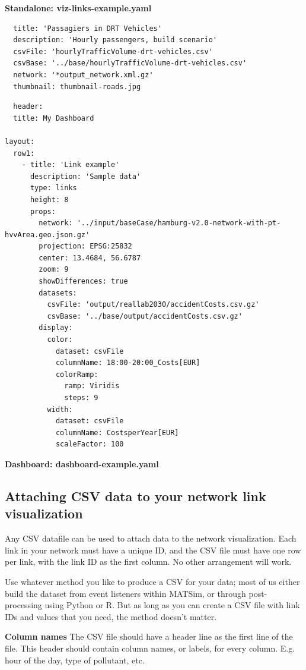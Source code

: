 \textbf{Standalone: viz-links-example.yaml}

\begin{lstlisting}
  title: 'Passagiers in DRT Vehicles'
  description: 'Hourly passengers, build scenario'
  csvFile: 'hourlyTrafficVolume-drt-vehicles.csv'
  csvBase: '../base/hourlyTrafficVolume-drt-vehicles.csv'
  network: '*output_network.xml.gz'
  thumbnail: thumbnail-roads.jpg
\end{lstlisting}

\begin{lstlisting}
  header:
  title: My Dashboard

layout:
  row1:
    - title: 'Link example'
      description: 'Sample data'
      type: links
      height: 8
      props:
        network: '../input/baseCase/hamburg-v2.0-network-with-pt-hvvArea.geo.json.gz'
        projection: EPSG:25832
        center: 13.4684, 56.6787
        zoom: 9
        showDifferences: true
        datasets:
          csvFile: 'output/reallab2030/accidentCosts.csv.gz'
          csvBase: '../base/output/accidentCosts.csv.gz'
        display:
          color:
            dataset: csvFile
            columnName: 18:00-20:00_Costs[EUR]
            colorRamp:
              ramp: Viridis
              steps: 9
          width:
            dataset: csvFile
            columnName: CostsperYear[EUR]
            scaleFactor: 100
\end{lstlisting}
\textbf{Dashboard: dashboard-example.yaml}

\hypertarget{attaching-csv-data-to-your-network-link-visualization}{%
\subsection{Attaching CSV data to your network link
visualization}\label{attaching-csv-data-to-your-network-link-visualization}}

Any CSV datafile can be used to attach data to the network
visualization. Each link in your network must have a unique ID, and the
CSV file must have one row per link, with the link ID as the first
column. No other arrangement will work.

Use whatever method you like to produce a CSV for your data; most of us
either build the dataset from event listeners within MATSim, or through
post-processing using Python or R. But as long as you can create a CSV
file with link IDs and values that you need, the method doesn't matter.

\textbf{Column names} The CSV file should have a header line as the
first line of the file. This header should contain column names, or
labels, for every column. E.g. hour of the day, type of pollutant, etc.

